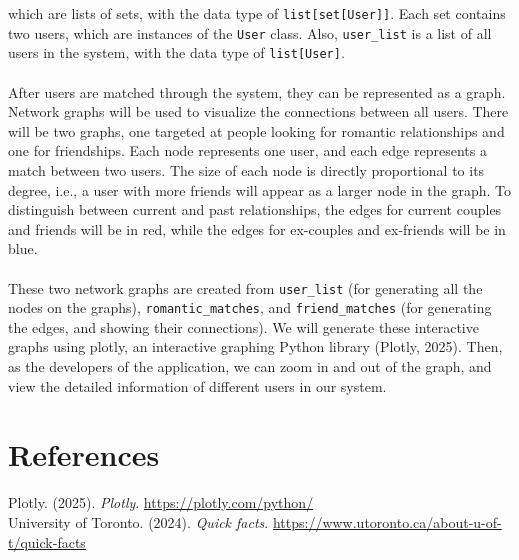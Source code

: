 \documentclass[fontsize=11pt]{article}
\begin{document}
which are lists of sets, with the data type of \texttt{list[set[User]]}.
Each set contains two users, which are instances of the \texttt{User} class.
Also, \texttt{user\_list} is a list of all users in the system, with the data type of \texttt{list[User]}.
\\
\\
After users are matched through the system, they can be represented as a graph.
Network graphs will be used to visualize the connections between all users.
There will be two graphs, one targeted at people looking for romantic relationships and one for friendships.
Each node represents one user, and each edge represents a match between two users.
The size of each node is directly proportional to its degree, i.e., a user with more friends will appear as a larger node in the graph.
To distinguish between current and past relationships, the edges for current couples and friends will be in red, while the edges for ex-couples and ex-friends will be in blue.
\\
\\
These two network graphs are created from \texttt{user\_list} (for generating all the nodes on the graphs),
\texttt{romantic\_matches}, and \texttt{friend\_matches} (for generating the edges, and showing their connections).
We will generate these interactive graphs using plotly, an interactive graphing Python library (Plotly, 2025).
Then, as the developers of the application, we can zoom in and out of the graph, and view the detailed information of different users in our system.

\section*{References}

Plotly. (2025). \textit{Plotly}.
\url{https://plotly.com/python/}
\\
University of Toronto. (2024). \textit{Quick facts}.
\url{https://www.utoronto.ca/about-u-of-t/quick-facts}


\end{document}
